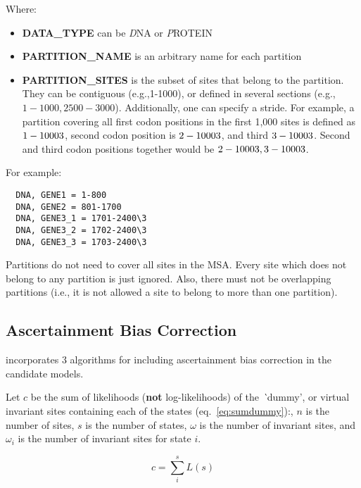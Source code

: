Where:

\begin{itemize}
  \item {\bf DATA\_TYPE} can be {\emph DNA} or {\emph PROTEIN}
  \item {\bf PARTITION\_NAME} is an arbitrary name for each partition
  \item {\bf PARTITION\_SITES} is the subset of sites that belong to the partition.
        They can be contiguous (e.g.,1-1000), or defined in several sections (e.g., $1-1000,2500-3000$).
        Additionally, one can specify a stride.
        For example, a partition covering all first codon positions in the first 1,000 sites is defined as $1-1000\\3$,
        second codon position is $2-1000\\3$, and third $3-1000\\3$.
        Second and third codon positions together would be $2-1000\\3,3-1000\\3$.
\end{itemize}

For example:

{
\begin{verbatim}
  DNA, GENE1 = 1-800
  DNA, GENE2 = 801-1700
  DNA, GENE3_1 = 1701-2400\3
  DNA, GENE3_2 = 1702-2400\3
  DNA, GENE3_3 = 1703-2400\3
\end{verbatim}
}

Partitions do not need to cover all sites in the MSA.
Every site which does not belong to any partition is just ignored.
Also, there must not be overlapping partitions (i.e., it is not allowed a site to belong to more than one partition).

\subsection{Ascertainment Bias Correction}
\label{sec:ascbias}

{\modeltest} incorporates 3 algorithms for including ascertainment bias correction in the candidate models.

Let $c$ be the sum of likelihoods ({\bf not} log-likelihoods) of the {\emph `dummy'}, or virtual invariant sites containing each of the states (eq.~\ref{eq:sumdummy}):,
$n$ is the number of sites,
$s$ is the number of states,
$\omega$ is the number of invariant sites,
and $\omega_i$ is the number of invariant sites for state $i$.

\begin{equation}
  \label{eq:sumdummy}
  c = \sum\limits_{i}^{s}L(s)
\end{equation}

